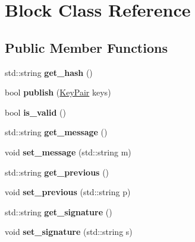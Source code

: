 \hypertarget{classBlock}{}\section{Block Class Reference}
\label{classBlock}
\subsection*{Public Member Functions}
\begin{DoxyCompactItemize}
\item 
std\+::string {\bfseries get\+\_\+hash} ()\hypertarget{classBlock_a3f77d6b13c89ccb2521ec6030c6e4aee}{}\label{classBlock_a3f77d6b13c89ccb2521ec6030c6e4aee}

\item 
bool {\bfseries publish} (\hyperlink{classKeyPair}{Key\+Pair} keys)\hypertarget{classBlock_a0adf0dea01a9f09cb2c9ba5b2e6ca3e8}{}\label{classBlock_a0adf0dea01a9f09cb2c9ba5b2e6ca3e8}

\item 
bool {\bfseries is\+\_\+valid} ()\hypertarget{classBlock_ab324f6622b9a95cb47e5b132a989871d}{}\label{classBlock_ab324f6622b9a95cb47e5b132a989871d}

\item 
std\+::string {\bfseries get\+\_\+message} ()\hypertarget{classBlock_ad2bbb2125be40e613e5b90ff2829fcc3}{}\label{classBlock_ad2bbb2125be40e613e5b90ff2829fcc3}

\item 
void {\bfseries set\+\_\+message} (std\+::string m)\hypertarget{classBlock_a27f1cea44eaafad3329402c9994111b9}{}\label{classBlock_a27f1cea44eaafad3329402c9994111b9}

\item 
std\+::string {\bfseries get\+\_\+previous} ()\hypertarget{classBlock_a952d5c0e36a541600f47ab7c96553bdb}{}\label{classBlock_a952d5c0e36a541600f47ab7c96553bdb}

\item 
void {\bfseries set\+\_\+previous} (std\+::string p)\hypertarget{classBlock_a8befbba81099799eeb1177039909c12d}{}\label{classBlock_a8befbba81099799eeb1177039909c12d}

\item 
std\+::string {\bfseries get\+\_\+signature} ()\hypertarget{classBlock_af1892d93098ade3a63e8860fa667f764}{}\label{classBlock_af1892d93098ade3a63e8860fa667f764}

\item 
void {\bfseries set\+\_\+signature} (std\+::string s)\hypertarget{classBlock_a6b65985d27c02c094c1a20611115fad8}{}\label{classBlock_a6b65985d27c02c094c1a20611115fad8}


\end{DoxyCompactItemize}
